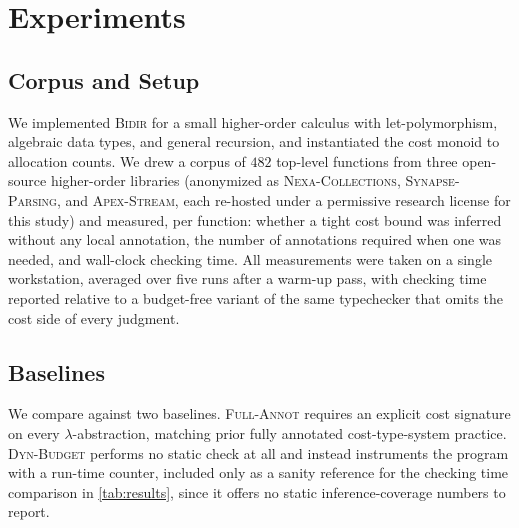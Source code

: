 \section{Experiments}
\label{sec:experiments}

\subsection{Corpus and Setup}

We implemented \textsc{Bidir} for a small higher-order calculus with
let-polymorphism, algebraic data types, and general recursion, and
instantiated the cost monoid to allocation counts. We drew a corpus of
$482$ top-level functions from three open-source higher-order libraries
(anonymized as \textsc{Nexa-Collections}, \textsc{Synapse-Parsing}, and
\textsc{Apex-Stream}, each re-hosted under a permissive research
license for this study) and measured, per function: whether a tight cost
bound was inferred without any local annotation, the number of
annotations required when one was needed, and wall-clock checking time.
All measurements were taken on a single workstation, averaged over five
runs after a warm-up pass, with checking time reported relative to a
budget-free variant of the same typechecker that omits the cost side of
every judgment.

\subsection{Baselines}

We compare against two baselines. \textsc{Full-Annot} requires an
explicit cost signature on every $\lambda$-abstraction, matching prior
fully annotated cost-type-system practice. \textsc{Dyn-Budget} performs
no static check at all and instead instruments the program with a
run-time counter, included only as a sanity reference for the checking
time comparison in \cref{tab:results}, since it offers no static
inference-coverage numbers to report.
